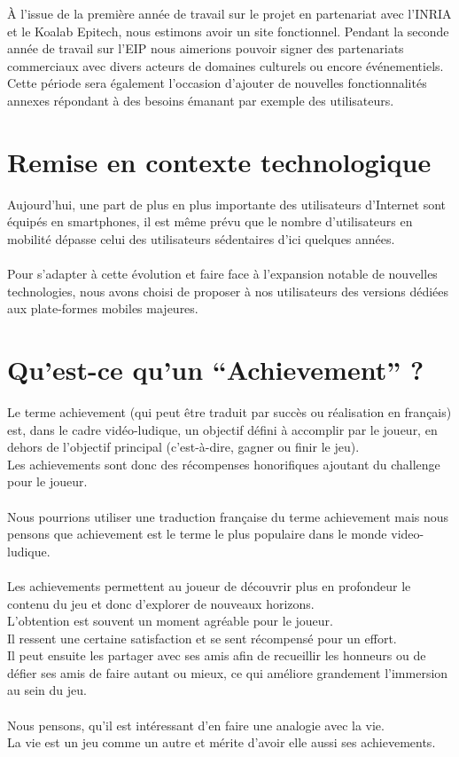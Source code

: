 \documentclass{life-fr}
\begin{document}
À l'issue de la première année de travail sur le projet en partenariat avec l'INRIA et le Koalab Epitech, nous estimons avoir un site fonctionnel. Pendant la seconde année de travail sur l'EIP nous aimerions pouvoir signer des partenariats commerciaux avec divers acteurs de domaines culturels ou encore événementiels. Cette période sera également l'occasion d'ajouter de nouvelles fonctionnalités annexes répondant à des besoins émanant par exemple des utilisateurs.

\newpage

\section{Remise en contexte technologique}

Aujourd'hui, une part de plus en plus importante des utilisateurs d'Internet sont équipés en smartphones, il est même prévu que le nombre d'utilisateurs en mobilité dépasse celui des utilisateurs sédentaires d'ici quelques années.\\
\\
Pour s’adapter à cette évolution et faire face à l’expansion notable de nouvelles technologies, nous avons choisi de proposer à nos utilisateurs des versions dédiées aux plate-formes mobiles majeures.

\section{Qu'est-ce qu'un ``Achievement'' ?}
Le terme achievement (qui peut être traduit par succès ou réalisation en français) est, dans le cadre vidéo-ludique,  un objectif défini à accomplir par le joueur, en dehors de l’objectif principal (c’est-à-dire, gagner ou finir le jeu).\\
 Les achievements sont donc des récompenses honorifiques ajoutant du challenge pour le joueur.\\
\\
Nous pourrions utiliser une traduction française du terme achievement mais nous pensons que achievement est le terme le plus populaire dans le monde video-ludique.\\
\\
Les achievements permettent au joueur de découvrir plus en profondeur le contenu du jeu et donc d’explorer de nouveaux horizons.\\
 L’obtention est souvent un moment agréable pour le joueur.\\
 Il ressent une certaine satisfaction et se sent récompensé pour un effort.\\
 Il peut ensuite les partager avec ses amis afin de recueillir les honneurs ou de défier ses amis de faire autant ou mieux, ce qui améliore grandement l’immersion au sein du jeu.\\
\\
Nous pensons, qu’il est intéressant d’en faire une analogie avec la vie.\\
 La vie est un jeu comme un autre et mérite d’avoir elle aussi ses achievements.
\end{document}
